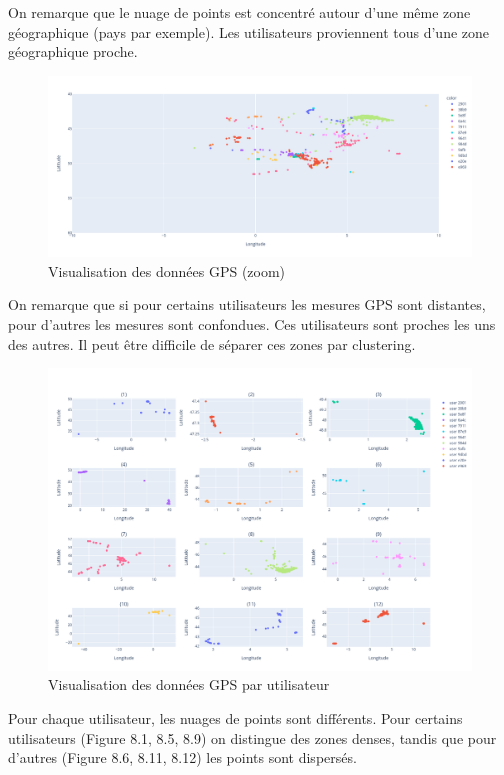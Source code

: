 \documentclass[10pt,a4paper]{article}
\begin{document}
On remarque que le nuage de points est concentré autour d'une même zone géographique (pays par exemple).
Les utilisateurs proviennent tous d'une zone géographique proche.

\begin{figure}[H]
    \includegraphics[scale=0.3]{gps_data_zoom}
    \centering
    \caption{Visualisation des données GPS (zoom)}
    \label{fig:figure7}
\end{figure}

On remarque que si pour certains utilisateurs les mesures GPS sont distantes,
pour d'autres les mesures sont confondues. Ces utilisateurs sont proches les uns des autres.
Il peut être difficile de séparer ces zones par clustering.

\begin{figure}[H]
    \includegraphics[scale=0.3]{gps_per_user}
    \centering
    \caption{Visualisation des données GPS par utilisateur}
    \label{fig:figure8}
\end{figure}

Pour chaque utilisateur, les nuages de points sont différents.
Pour certains utilisateurs (Figure 8.1, 8.5, 8.9) on distingue des zones denses,
tandis que pour d'autres (Figure 8.6, 8.11, 8.12) les points sont dispersés.
\end{document}
